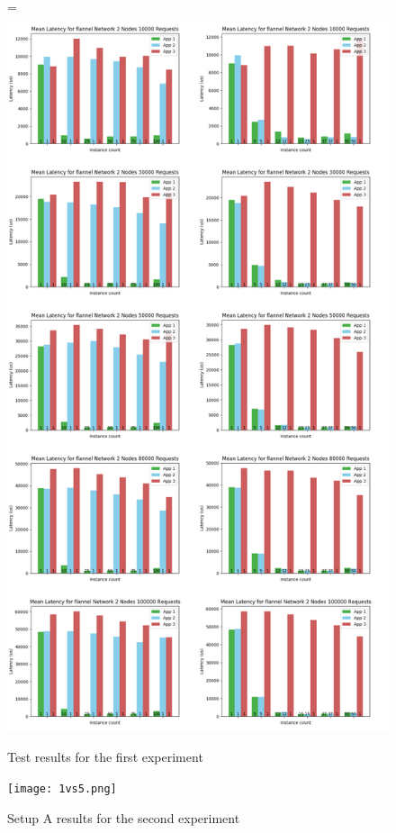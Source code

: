 \documentclass[12pt,oneandhalf,chaparabic,ceng,ms,eng,oneside,pntc]{gsufbe}
\makeatletter
\let\old@includegraphics\includegraphics
\renewcommand{\includegraphics}[2][,]{%
  \setbox9=\hbox{\old@includegraphics[#1]{#2}}%
  \ifdim\wd9>\textwidth
    \old@includegraphics[#1,width=\textwidth]{#2}%
  \else
    \old@includegraphics[#1]{#2}%
  \fi%
}
\makeatother
\begin{document}
\begin{figure}
\centering
\includegraphics[]{flannel.png}
\caption{Test results for the first experiment}
\label{flannel}
\end{figure}

\begin{figure}
\centering
\texttt{[image: 1vs5.png]}
\caption{Setup A results for the second experiment}
\label{fig:1vs5}
\end{figure}
\end{document}
